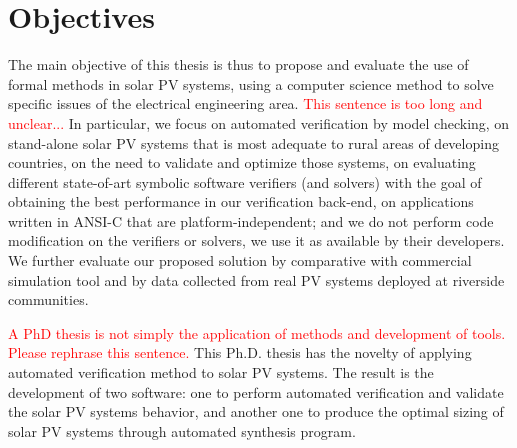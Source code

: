 \section{Objectives}

The main objective of this thesis is thus to propose and evaluate the use of formal methods in solar PV systems, using a computer science method to solve specific issues of the electrical engineering area. \textcolor{red}{This sentence is too long and unclear...} In particular, we focus on automated verification by model checking, on stand-alone solar PV systems that is most adequate to rural areas of developing countries, on the need to validate and optimize those systems, on evaluating different state-of-art symbolic software verifiers (and solvers) with the goal of obtaining the best performance in our verification back-end, on applications written in ANSI-C that are platform-independent; and we do not perform code modification on the verifiers or solvers, we use it as available by their developers. We further evaluate our proposed solution by comparative with commercial simulation tool and by data collected from real PV systems deployed at riverside communities.

\textcolor{red}{A PhD thesis is not simply the application of methods and development of tools. Please rephrase this sentence.}
This Ph.D. thesis has the novelty of applying automated verification method to solar PV systems. The result is the development of two software: one to perform automated verification and validate the solar PV systems behavior, and another one to produce the optimal sizing of solar PV systems through automated synthesis program.

